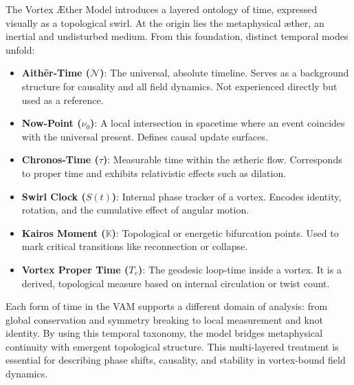 \documentclass[12pt]{article}
\begin{document}
    The Vortex Æther Model introduces a layered ontology of time, expressed visually as a topological swirl. At the origin lies the metaphysical æther, an inertial and undisturbed medium. From this foundation, distinct temporal modes unfold:

    \begin{itemize}
        \item \textbf{Aithēr-Time (\( \mathcal{N} \))}: The universal, absolute timeline. Serves as a background structure for causality and all field dynamics. Not experienced directly but used as a reference.
        \item \textbf{Now-Point (\( \nu_0 \))}: A local intersection in spacetime where an event coincides with the universal present. Defines causal update surfaces.
        \item \textbf{Chronos-Time (\( \tau \))}: Measurable time within the ætheric flow. Corresponds to proper time and exhibits relativistic effects such as dilation.
        \item \textbf{Swirl Clock (\( S(t) \))}: Internal phase tracker of a vortex. Encodes identity, rotation, and the cumulative effect of angular motion.
        \item \textbf{Kairos Moment (\( \mathbb{K} \))}: Topological or energetic bifurcation points. Used to mark critical transitions like reconnection or collapse.
        \item \textbf{Vortex Proper Time (\( T_v \))}: The geodesic loop-time inside a vortex. It is a derived, topological measure based on internal circulation or twist count.
    \end{itemize}

    Each form of time in the VAM supports a different domain of analysis: from global conservation and symmetry breaking to local measurement and knot identity. By using this temporal taxonomy, the model bridges metaphysical continuity with emergent topological structure. This multi-layered treatment is essential for describing phase shifts, causality, and stability in vortex-bound field dynamics.
\end{document}
